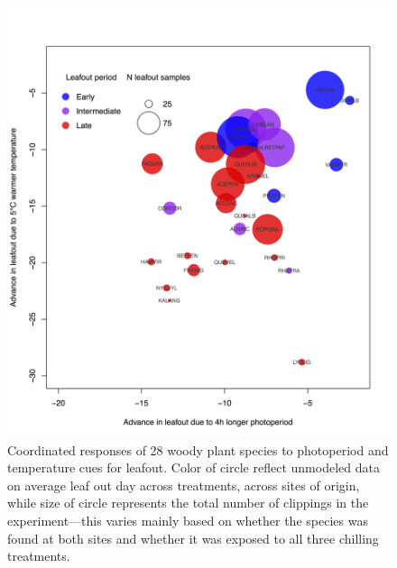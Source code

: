 \documentclass{article}
\begin{document}

\clearpage 


\begin{figure} 
\begin{center}
\includegraphics[scale=0.5]{Advplot2.png}
\caption{Coordinated responses of 28 woody plant species to photoperiod and temperature cues for leafout. Color of circle reflect unmodeled data on average leaf out day across treatments, across sites of origin, while size of circle represents the total number of clippings in the experiment---this varies mainly based on whether the species was found at both sites and whether it was exposed to all three chilling treatments. } %
\label{fig1}
\end{center}
\end{figure}
\end{document}
